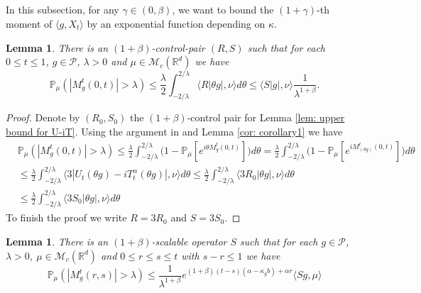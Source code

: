\documentclass[12pt,oneside,english]{amsart}
\theoremstyle{plain}
\newtheorem{lem}[thm]{Lemma}
\theoremstyle{definition}
\numberwithin{equation}{section}
\newcommand{\added}[1]{{\color{blue}#1}}\newcommand{\deleted}[1]{{\color{red}#1}}
\begin{document}
\subsection{}

 In this subsection, for any $\gamma \in (0,\beta)$, we want to bound the $(1+\gamma)$-th moment of $\langle g ,X_t \rangle$ \deleted{by an exponential function depending on $\kappa$}.

\added{
\begin{lem}
\label{lem: control pair for P(M>lambda)}
    There is an $(1+\beta)$-control-pair $(R,S)$ such that for each $0\leq t\leq 1$, $g\in \mathcal P$, $\lambda >0$ and $\mu\in \mathcal M_c(\mathbb R^d)$ we have
\[
    \mathbb P_\mu (|M^t_g(0,t)| > \lambda)
    \leq \frac{\lambda}{2}\int_{-2/\lambda}^{2/\lambda}\langle R|\theta g|,\nu\rangle d\theta
    \leq \langle S| g|,\nu\rangle \frac{1}{\lambda^{1+\beta}}.
\]
\end{lem}
}
\added{
\begin{proof}
    Denote by $(R_0,S_0)$ the $(1+\beta)$-control pair for Lemma \ref{lem: upper bound for U-iT}.
    Using the argument in \cite[Proof of Theorem 3.3.6]{Durrett2010Probability} and Lemma \ref{cor: corollary1} we have
\begin{align}
    &\mathbb P_\mu (|M^t_g(0,t)| > \lambda)
    \leq \frac{\lambda}{2}\int_{-2/\lambda}^{2/\lambda}\Big(1 - \mathbb P_\mu[e^{i\theta M_g^t(0,t)}]\Big)d\theta
    = \frac{\lambda}{2}\int_{-2/\lambda}^{2/\lambda}\Big(1 - \mathbb P_\mu[e^{iM_{(\theta g)}^t(0,t)}]\Big)d\theta
    \\&\leq \frac{\lambda}{2}\int_{-2/\lambda}^{2/\lambda}\langle 3|U_t(\theta g) - iT_t^\alpha(\theta g)|,\nu\rangle d\theta
    \leq \frac{\lambda}{2}\int_{-2/\lambda}^{2/\lambda}\langle 3R_0|\theta g|,\nu\rangle d\theta
    \\& \leq \frac{\lambda}{2}\int_{-2/\lambda}^{2/\lambda}\langle 3S_0|\theta g|,\nu\rangle d\theta
\end{align}
    To finish the proof we write $R=3R_0$ and $S= 3S_0$.
\end{proof}
}
\added{
\begin{lem}
    There is an $(1+\beta)$-scalable operator $S$ such that for each $g\in \mathcal P$, $\lambda >0$, $\mu\in \mathcal M_c(\mathbb R^d)$ and $0\leq r\leq s\leq t$ with $s-r \leq 1$ we have
\[
    \mathbb P_{\mu}(|M^t_g(r,s)|>\lambda)
    \leq \frac{ 1}{\lambda^{1+\beta}} e^{(1+\beta)(t-s)(\alpha- \kappa_gb)+ \alpha r} \langle Sg,\mu\rangle
\]
\end{lem}
}
\end{document}
